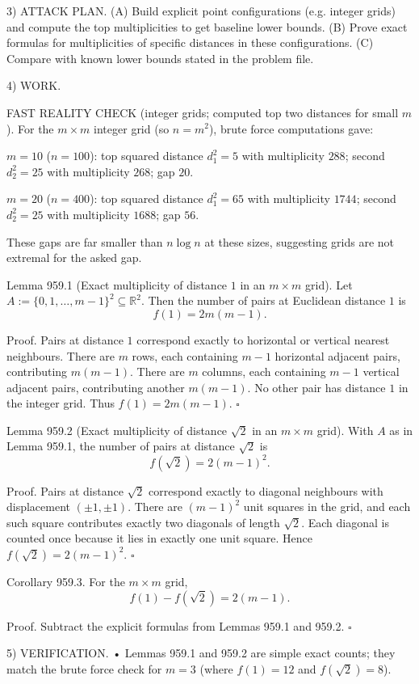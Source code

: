 3) ATTACK PLAN.
(A) Build explicit point configurations (e.g. integer grids) and compute the top multiplicities to get baseline lower bounds.
(B) Prove exact formulas for multiplicities of specific distances in these configurations.
(C) Compare with known lower bounds stated in the problem file.

4) WORK.

FAST REALITY CHECK (integer grids; computed top two distances for small $m$).
For the $m\times m$ integer grid (so $n=m^2$), brute force computations gave:

$m=10$ ($n=100$): top squared distance $d_1^2=5$ with multiplicity $288$; second $d_2^2=25$ with multiplicity $268$; gap $20$.

$m=20$ ($n=400$): top squared distance $d_1^2=65$ with multiplicity $1744$; second $d_2^2=25$ with multiplicity $1688$; gap $56$.

These gaps are far smaller than $n\log n$ at these sizes, suggesting grids are not extremal for the asked gap.

Lemma 959.1 (Exact multiplicity of distance $1$ in an $m\times m$ grid).
Let
$A:=\{0,1,\dots,m-1\}^2\subseteq\mathbb{R}^2$.
Then the number of pairs at Euclidean distance $1$ is
\[
 f(1)=2m(m-1).
\]

Proof.
Pairs at distance $1$ correspond exactly to horizontal or vertical nearest neighbours.
There are $m$ rows, each containing $m-1$ horizontal adjacent pairs, contributing $m(m-1)$.
There are $m$ columns, each containing $m-1$ vertical adjacent pairs, contributing another $m(m-1)$.
No other pair has distance $1$ in the integer grid.
Thus $f(1)=2m(m-1)$.
\hfill $\square$

Lemma 959.2 (Exact multiplicity of distance $\sqrt{2}$ in an $m\times m$ grid).
With $A$ as in Lemma 959.1, the number of pairs at distance $\sqrt{2}$ is
\[
 f(\sqrt{2})=2(m-1)^2.
\]

Proof.
Pairs at distance $\sqrt{2}$ correspond exactly to diagonal neighbours with displacement $(\pm 1,\pm 1)$.
There are $(m-1)^2$ unit squares in the grid, and each such square contributes exactly two diagonals of length $\sqrt{2}$.
Each diagonal is counted once because it lies in exactly one unit square.
Hence $f(\sqrt{2})=2(m-1)^2$.
\hfill $\square$

Corollary 959.3.
For the $m\times m$ grid,
\[
 f(1)-f(\sqrt{2})=2(m-1).
\]

Proof.
Subtract the explicit formulas from Lemmas 959.1 and 959.2.
\hfill $\square$

5) VERIFICATION.
• Lemmas 959.1 and 959.2 are simple exact counts; they match the brute force check for $m=3$ (where $f(1)=12$ and $f(\sqrt{2})=8$).

